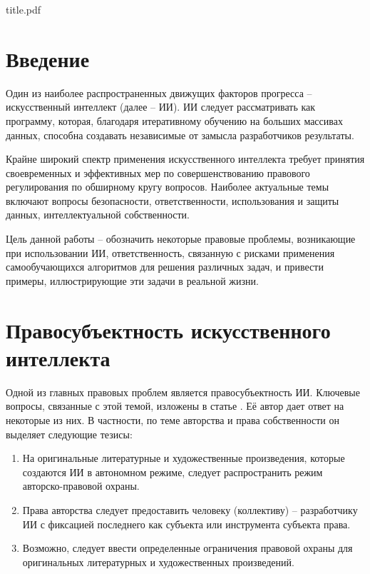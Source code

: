

\def\oldbibitem{}
\let\oldbibitem=\bibitem
\def\bibitem{\stepcounter{citenum}\oldbibitem}



{title.pdf}

\tableofcontents
\newpage

\section{Введение}
Один из наиболее распространенных движущих факторов прогресса – искусственный
интеллект (далее – ИИ). ИИ следует рассматривать как программу, которая, благодаря
итеративному обучению на больших массивах данных, способна создавать независимые от
замысла разработчиков результаты.

Крайне широкий спектр применения искусственного интеллекта требует принятия
своевременных и эффективных мер по совершенствованию правового регулирования по
обширному кругу вопросов. Наиболее актуальные темы включают вопросы безопасности,
ответственности, использования и защиты данных, интеллектуальной собственности.

Цель данной работы -- обозначить некоторые правовые проблемы, возникающие при использовании ИИ,
ответственность, связанную с рисками применения самообучающихся алгоритмов для
решения различных задач, и привести примеры, иллюстрирующие эти задачи в реальной жизни.

\newpage
\section{Правосубъектность искусственного интеллекта}
Одной из главных правовых проблем является правосубъектность ИИ. Ключевые вопросы, связанные
с этой темой, изложены в статье \cite{II}. Её автор дает ответ на некоторые из них.
В частности, по теме авторства и права собственности он выделяет следующие тезисы:

\begin{enumerate}
\item На оригинальные литературные и художественные произведения, которые создаются ИИ в автономном режиме,
следует распространить режим авторско-правовой охраны.
\item Права авторства следует предоставить человеку (коллективу) – разработчику ИИ с фиксацией последнего как
субъекта или инструмента субъекта права.
\item Возможно, следует ввести определенные ограничения правовой охраны для оригинальных литературных и
художественных произведений.
\end{enumerate}

